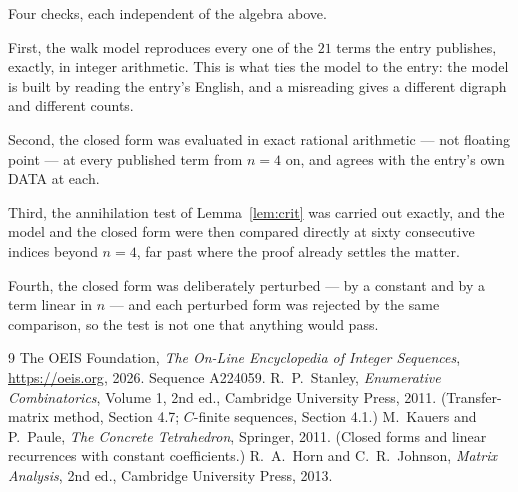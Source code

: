\documentclass[11pt,a4paper]{article}
\theoremstyle{plain}
\theoremstyle{definition}
\begin{document}
Four checks, each independent of the algebra above.

First, the walk model reproduces every one of the $21$ terms the entry publishes,
exactly, in integer arithmetic. This is what ties the model to the entry: the model is built
by reading the entry's English, and a misreading gives a different digraph and different
counts.

Second, the closed form was evaluated in exact rational arithmetic --- not floating point ---
at every published term from $n=4$ on, and agrees with the entry's own DATA at each.

Third, the annihilation test of Lemma~\ref{lem:crit} was carried out exactly, and the model
and the closed form were then compared directly at sixty consecutive indices beyond
$n=4$, far past where the proof already settles the matter.

Fourth, the closed form was deliberately perturbed --- by a constant and by a term linear in
$n$ --- and each perturbed form was rejected by the same comparison, so the test is not one
that anything would pass.

\begin{thebibliography}{9}
 The OEIS Foundation, \emph{The On-Line Encyclopedia of Integer
Sequences}, \url{https://oeis.org}, 2026. Sequence A224059.
 R.~P.~Stanley, \emph{Enumerative Combinatorics}, Volume 1, 2nd ed.,
Cambridge University Press, 2011. (Transfer-matrix method, Section 4.7; $C$-finite sequences,
Section 4.1.)
 M.~Kauers and P.~Paule, \emph{The Concrete Tetrahedron}, Springer, 2011.
(Closed forms and linear recurrences with constant coefficients.)
 R.~A.~Horn and C.~R.~Johnson, \emph{Matrix Analysis}, 2nd ed., Cambridge
University Press, 2013.
\end{thebibliography}
\end{document}
